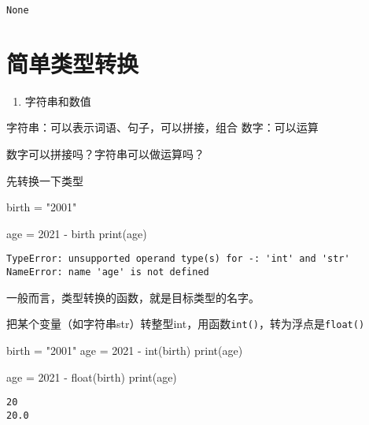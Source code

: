 \documentclass[
  letterpaper,
  DIV=11,
  numbers=noendperiod]{scrreprt}
\newenvironment{Shaded}{\begin{snugshade}}{\end{snugshade}}
\newcommand{\BuiltInTok}[1]{\textcolor[rgb]{0.00,0.23,0.31}{#1}}
\newcommand{\DecValTok}[1]{\textcolor[rgb]{0.68,0.00,0.00}{#1}}
\newcommand{\NormalTok}[1]{\textcolor[rgb]{0.00,0.23,0.31}{#1}}
\newcommand{\OperatorTok}[1]{\textcolor[rgb]{0.37,0.37,0.37}{#1}}
\newcommand{\StringTok}[1]{\textcolor[rgb]{0.13,0.47,0.30}{#1}}
\providecommand{\tightlist}{%
  \setlength{\itemsep}{0pt}\setlength{\parskip}{0pt}}\usepackage{longtable,booktabs,array}
\begin{document}
\begin{verbatim}
None
\end{verbatim}

\hypertarget{ux7b80ux5355ux7c7bux578bux8f6cux6362}{%
\section{简单类型转换}\label{ux7b80ux5355ux7c7bux578bux8f6cux6362}}

\begin{enumerate}
\def\labelenumi{\arabic{enumi}.}
\tightlist
\item
  字符串和数值
\end{enumerate}

字符串：可以表示词语、句子，可以拼接，组合 数字：可以运算

数字可以拼接吗？字符串可以做运算吗？

先转换一下类型

\begin{Shaded}
\begin{Highlighting}[]
\NormalTok{birth }\OperatorTok{=} \StringTok{"2001"}

\NormalTok{age }\OperatorTok{=} \DecValTok{2021} \OperatorTok{{-}}\NormalTok{ birth}
\BuiltInTok{print}\NormalTok{(age)}
\end{Highlighting}
\end{Shaded}

\begin{verbatim}
TypeError: unsupported operand type(s) for -: 'int' and 'str'
NameError: name 'age' is not defined
\end{verbatim}

一般而言，类型转换的函数，就是目标类型的名字。

把某个变量（如字符串str）转整型int，用函数\texttt{int()}，转为浮点是\texttt{float()}

\begin{Shaded}
\begin{Highlighting}[]
\NormalTok{birth }\OperatorTok{=} \StringTok{"2001"}
\NormalTok{age }\OperatorTok{=} \DecValTok{2021} \OperatorTok{{-}} \BuiltInTok{int}\NormalTok{(birth)}
\BuiltInTok{print}\NormalTok{(age)}

\NormalTok{age }\OperatorTok{=} \DecValTok{2021} \OperatorTok{{-}} \BuiltInTok{float}\NormalTok{(birth)}
\BuiltInTok{print}\NormalTok{(age)}
\end{Highlighting}
\end{Shaded}

\begin{verbatim}
20
20.0
\end{verbatim}
\end{document}
